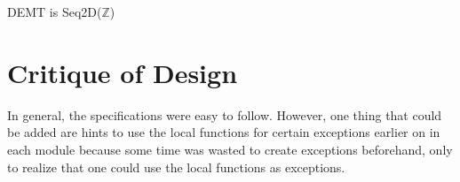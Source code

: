 \documentclass[12pt]{article}
\begin{document}
DEMT is Seq2D($\mathbb{Z}$)

\newpage

\section*{Critique of Design}

In general, the specifications were easy to follow. However, one thing that could be added are hints to use the local functions for certain exceptions earlier on in each module because some time was wasted to create exceptions beforehand, only to realize that one could use the local functions as exceptions.
\end{document}
